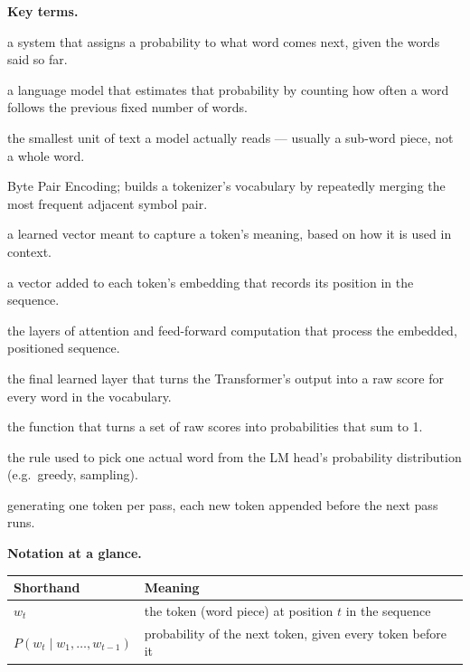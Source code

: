 \documentclass[a4paper,11pt]{article}
\begin{document}
\noindent\textbf{Key terms.}
\begin{description}[leftmargin=9em,style=nextline,font=\normalfont\bfseries\color{navy}]
  \item[language model] a system that assigns a probability to what word
    comes next, given the words said so far.
  \item[n-gram model] a language model that estimates that probability by
    counting how often a word follows the previous fixed number of words.
  \item[token] the smallest unit of text a model actually reads --- usually
    a sub-word piece, not a whole word.
  \item[BPE] Byte Pair Encoding; builds a tokenizer's vocabulary by
    repeatedly merging the most frequent adjacent symbol pair.
  \item[embedding] a learned vector meant to capture a token's meaning,
    based on how it is used in context.
  \item[positional encoding] a vector added to each token's embedding that
    records its position in the sequence.
  \item[Transformer stack] the layers of attention and feed-forward
    computation that process the embedded, positioned sequence.
  \item[LM head] the final learned layer that turns the Transformer's
    output into a raw score for every word in the vocabulary.
  \item[softmax] the function that turns a set of raw scores into
    probabilities that sum to 1.
  \item[decoding strategy] the rule used to pick one actual word from the
    LM head's probability distribution (e.g.\ greedy, sampling).
  \item[autoregressive generation] generating one token per pass, each new
    token appended before the next pass runs.
\end{description}

\medskip
\noindent\textbf{Notation at a glance.}
\begin{center}\small
\begin{tabular}{@{}ll@{}}
\toprule
\textbf{Shorthand} & \textbf{Meaning} \\
\midrule
$w_t$ & the token (word piece) at position $t$ in the sequence \\
$P(w_t \mid w_1,\ldots,w_{t-1})$ & probability of the next token, given every token before it \\
\bottomrule
\end{tabular}
\end{center}
\end{document}

